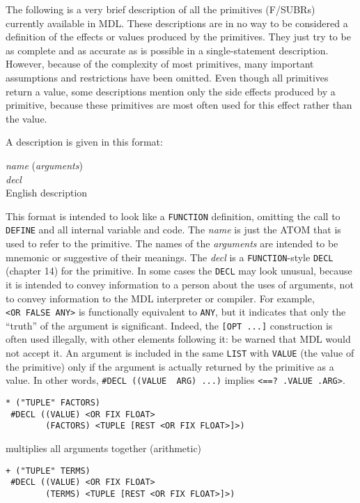 \documentclass[a4paper,]{article}
\begin{document}
The following is a very brief description of all the primitives (F/SUBRs) currently available in MDL. These descriptions
are in no way to be considered a definition of the effects or values produced by the primitives. They just try to be as
complete and as accurate as is possible in a single-statement description. However, because of the complexity of most
primitives, many important assumptions and restrictions have been omitted. Even though all primitives return a value, some
descriptions mention only the side effects produced by a primitive, because these primitives are most often used for this
effect rather than the value.

A description is given in this format:

\emph{name} (\emph{arguments})\\
\emph{decl}\\
English description

This format is intended to look like a \texttt{FUNCTION} definition, omitting the call to \texttt{DEFINE} and all internal
variable and code. The \emph{name} is just the ATOM that is used to refer to the primitive. The names of the
\emph{arguments} are intended to be mnemonic or suggestive of their meanings. The \emph{decl} is a \texttt{FUNCTION}-style
\texttt{DECL} (chapter 14) for the primitive. In some cases the \texttt{DECL} may look unusual, because it is intended to
convey information to a person about the uses of arguments, not to convey information to the MDL interpreter or compiler.
For example, \texttt{\textless{}OR\ FALSE\ ANY\textgreater{}} is functionally equivalent to \texttt{ANY}, but it indicates
that only the ``truth'' of the argument is significant. Indeed, the \texttt{{[}OPT\ ...{]}} construction is often used
illegally, with other elements following it: be warned that MDL would not accept it. An argument is included in the same
\texttt{LIST} with \texttt{VALUE} (the value of the primitive) only if the argument is actually returned by the primitive
as a value. In other words, \texttt{\#DECL\ ((VALUE\ \ ARG)\ ...)} implies
\texttt{\textless{}==?\ .VALUE\ .ARG\textgreater{}}.

\begin{verbatim}
* ("TUPLE" FACTORS)
 #DECL ((VALUE) <OR FIX FLOAT>
        (FACTORS) <TUPLE [REST <OR FIX FLOAT>]>)
\end{verbatim}

multiplies all arguments together (arithmetic)

\begin{verbatim}
+ ("TUPLE" TERMS)
 #DECL ((VALUE) <OR FIX FLOAT>
        (TERMS) <TUPLE [REST <OR FIX FLOAT>]>)
\end{verbatim}
\end{document}

